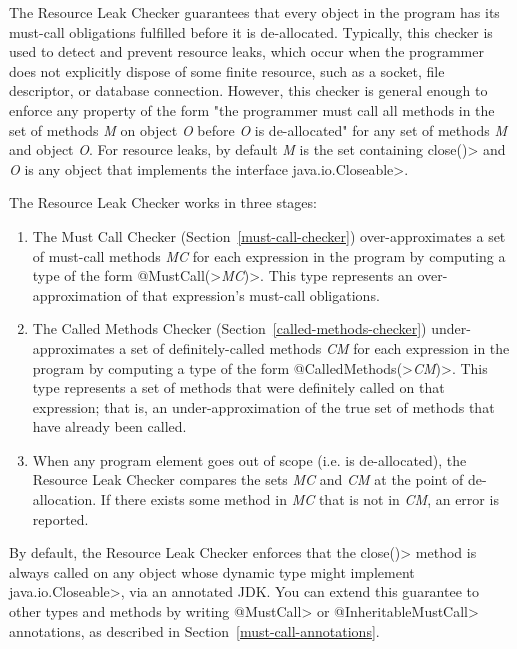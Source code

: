 \htmlhr
{}

The Resource Leak Checker guarantees that every object in the program
has its must-call obligations fulfilled before it is de-allocated.
Typically, this checker is used to detect and prevent resource leaks,
which occur when the programmer does not explicitly dispose of some finite resource,
such as a socket, file descriptor, or database connection. However, this checker
is general enough to enforce any property of the form "the programmer must call
all methods in the set of methods \emph{M} on object \emph{O} before \emph{O}
is de-allocated" for any set of methods \emph{M} and object \emph{O}.
For resource leaks, by default \emph{M} is the set containing \<close()> and \emph{O}
is any object that implements the interface \<java.io.Closeable>.

The Resource Leak Checker works in three stages:
\begin{enumerate}
\item The Must Call Checker (Section~\ref{must-call-checker})
over-approximates a set of must-call methods \emph{MC} for each expression
in the program by computing a type of the form \<@MustCall(>\emph{MC}\<)>.
This type represents an over-approximation of that expression's must-call obligations.
\item The Called Methods Checker (Section~\ref{called-methods-checker})
under-approximates a set of definitely-called methods \emph{CM} for each expression
in the program by computing a type of the form \<@CalledMethods(>\emph{CM}\<)>.
This type represents a set of methods that were definitely called on that expression;
that is, an under-approximation of the true set of methods that have already been called.
\item When any program element goes out of scope (i.e. is de-allocated), the Resource
Leak Checker compares the sets \emph{MC} and \emph{CM} at the point of de-allocation.
If there exists some method in \emph{MC} that is not in \emph{CM}, an error is reported.
\end{enumerate}

By default, the Resource Leak Checker enforces that the \<close()> method is always
called on any object whose dynamic type might implement \<java.io.Closeable>, via an annotated
JDK. You can extend this guarantee to other types and methods by writing
\<@MustCall> or \<@InheritableMustCall> annotations, as described in
Section~\ref{must-call-annotations}.

